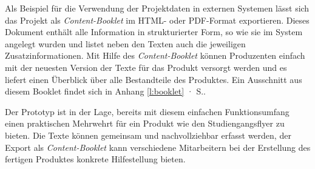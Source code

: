 Als Beispiel für die Verwendung der Projektdaten in externen Systemen lässt sich das Projekt als \emph{Content-Booklet} im HTML- oder PDF-Format exportieren. Dieses Dokument enthält alle Information in strukturierter Form, so wie sie im System angelegt wurden und listet neben den Texten auch die jeweiligen Zusatzinformationen. Mit Hilfe des \emph{Content-Booklet} können Produzenten einfach mit der neuesten Version der Texte für das Produkt versorgt werden und es liefert einen Überblick über alle Bestandteile des Produktes. Ein Ausschnitt aus diesem Booklet findet sich in Anhang \ref{l:booklet} · S.\pageref{l:booklet}.

\secbar

Der Prototyp ist in der Lage, bereits mit diesem einfachen Funktionsumfang einen praktischen Mehrwehrt für ein Produkt wie den Studiengangsflyer zu bieten. Die Texte können gemeinsam und nachvollziehbar erfasst werden, der Export als \emph{Content-Booklet} kann verschiedene Mitarbeitern bei der Erstellung des fertigen Produktes konkrete Hilfestellung bieten.

